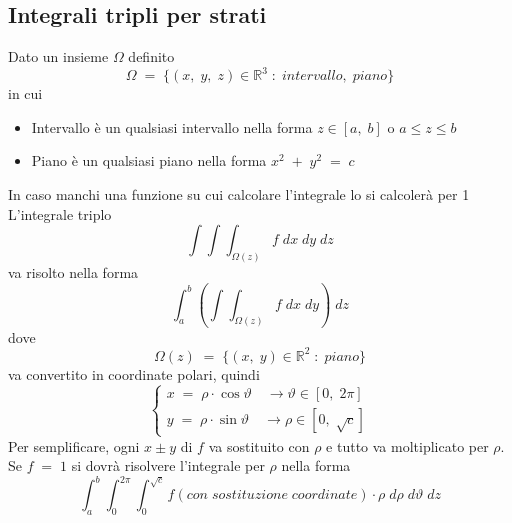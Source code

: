 \documentclass[a4paper, 10pt]{article}
\begin{document}
 			\subsection{Integrali tripli per strati}
 				Dato un insieme $ \Omega $	definito
 					\[
	 					\Omega\; =\; \{ (x,\; y,\; z) \in \mathbb{R}^3\; :\; intervallo,\; piano \}
 					\]
 				in cui
 					\begin{itemize}
 						\item Intervallo è un qualsiasi intervallo nella forma $ z \in [a,\; b] $ o $ a \leq z \leq b $
 						\item Piano è un qualsiasi piano nella forma $ x^2\; +\; y^2\; =\; c $ 
 					\end{itemize}
 				In caso manchi una funzione su cui calcolare l'integrale lo si calcolerà per 1\\
 				L'integrale triplo
 					\[
	 					\int{\int{\int_{\Omega(z)}{f}}}\; dx\;dy\;dz
 					\]
 				va risolto nella forma
 					\[
 						\int_{a}^{b}{\left( \int{\int_{\Omega(z)}{f}}\; dx\; dy \right)}\; dz
 					\]
 				dove
 					\[
 						\Omega(z)\; =\; \{ (x,\; y) \in \mathbb{R}^2\; :\; piano \}
 					\]
 				va convertito in coordinate polari, quindi
 					\[
	 					\begin{cases}
		 					x\; =\; \rho \cdot \cos{\vartheta}\quad \rightarrow \vartheta \in [0,\; 2\pi] \\
		 					y\; =\; \rho \cdot \sin{\vartheta}\quad \rightarrow \rho \in [0,\; \sqrt{c}]
	 					\end{cases} 
 					\]
 				Per semplificare, ogni $ x \pm y $ di $ f $ va sostituito con $ \rho $ e tutto va moltiplicato per $ \rho $.\\
 				Se $ f\; =\; 1 $ si dovrà risolvere l'integrale per $ \rho $ nella forma
 					\[
	 					\int_{a}^{b}{\int_{0}^{2\pi}{\int_{0}^{\sqrt{c}}{f(con\; sostituzione\; coordinate)\cdot \rho}}}\; d\rho\; d\vartheta\; dz
 					\]
 			
\end{document}
